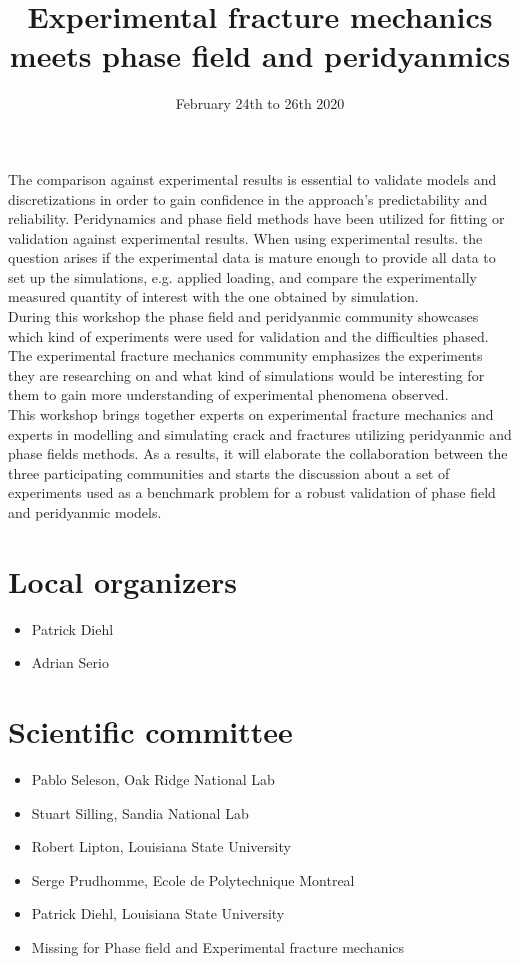 \documentclass{article}
\title{Experimental fracture mechanics meets phase field and peridyanmics}
\date{February 24th to 26th 2020}
\begin{document}
\maketitle

The comparison against experimental results is essential to validate models and discretizations in order to gain confidence in the approach’s predictability and reliability. Peridynamics and phase field methods have been utilized for fitting or validation against experimental results. When using experimental results. the question arises if the experimental data is mature enough to provide all data to set up the simulations, e.g. applied loading, and compare the experimentally measured quantity of interest with the one obtained by simulation. \\

During this workshop the phase field and peridyanmic community showcases which kind of experiments were used for validation and the difficulties phased. The experimental fracture mechanics community emphasizes the experiments they are researching on and what kind of simulations would be interesting for them to gain more understanding of experimental phenomena observed. \\

This workshop brings together experts on experimental fracture mechanics and experts in modelling and simulating crack and fractures utilizing peridyanmic and phase fields methods. As a results, it will elaborate the collaboration between the three participating communities and starts the discussion about a set of experiments used as a benchmark problem for a robust validation of phase field and peridyanmic models.




\section*{Local organizers}
\begin{itemize}
    \item Patrick Diehl
    \item Adrian Serio
\end{itemize}

\section*{Scientific committee}
\begin{itemize}
\item Pablo Seleson, Oak Ridge National Lab
\item Stuart Silling, Sandia National Lab
\item Robert Lipton, Louisiana State University
\item Serge Prudhomme, Ecole de Polytechnique Montreal
\item Patrick Diehl, Louisiana State University
\item Missing for Phase field and Experimental fracture mechanics
\end{itemize}
\end{document}

